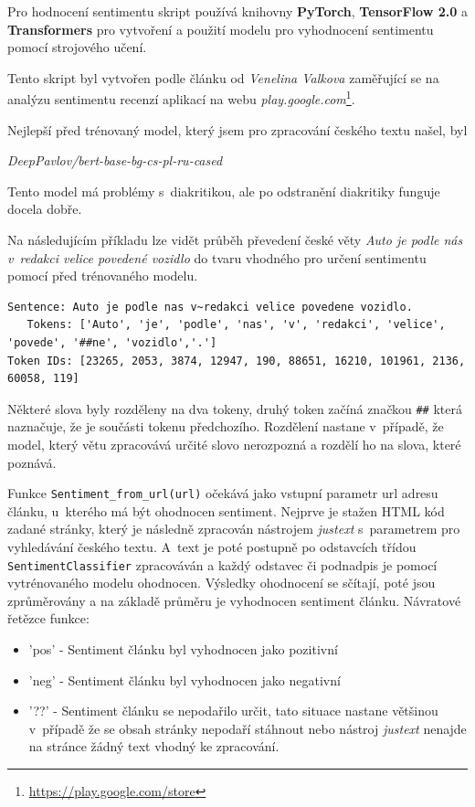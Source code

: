 Pro hodnocení sentimentu skript používá knihovny \textbf{PyTorch}, \textbf{TensorFlow 2.0} a \textbf{Transformers} pro vytvoření a použití modelu pro vyhodnocení sentimentu pomocí strojového učení.

Tento skript byl vytvořen podle článku od \textit{Venelina Valkova} zaměřující se na analýzu sentimentu recenzí aplikací na webu \textit{play.google.com}\footnote{\url{https://play.google.com/store}}\cite{valkov_2020}.

Nejlepší před trénovaný model, který jsem pro zpracování českého textu našel, byl
\begin{center}
 \textit{DeepPavlov/bert-base-bg-cs-pl-ru-cased}   
\end{center}
Tento model má problémy s~diakritikou, ale po odstranění diakritiky funguje docela dobře.

Na následujícím příkladu lze vidět průběh převedení české věty \textit{Auto je podle nás v~redakci velice povedené vozidlo} do tvaru vhodného pro určení sentimentu pomocí před trénovaného modelu.
\begin{lstlisting}[basicstyle=\small]
 Sentence: Auto je podle nas v~redakci velice povedene vozidlo.
   Tokens: ['Auto', 'je', 'podle', 'nas', 'v', 'redakci', 'velice', 'povede', '##ne', 'vozidlo','.']
Token IDs: [23265, 2053, 3874, 12947, 190, 88651, 16210, 101961, 2136, 60058, 119]
\end{lstlisting}

Některé slova byly rozděleny na dva tokeny, druhý token začíná značkou \verb|##| která naznačuje, že je součásti tokenu předchozího. Rozdělení nastane v~případě, že model, který větu zpracovává určité slovo nerozpozná a rozdělí ho na slova, které poznává.

Funkce \verb|Sentiment_from_url(url)| očekává jako vstupní parametr url adresu článku, u~kterého má být ohodnocen sentiment. Nejprve je stažen HTML kód zadané stránky, který je následně zpracován nástrojem \textit{justext} s~parametrem pro vyhledávání českého textu. A~text je poté postupně po odstavcích třídou \verb|SentimentClassifier| zpracováván a každý odstavec či podnadpis je pomocí vytrénovaného modelu ohodnocen. Výsledky ohodnocení se sčítají, poté jsou zprůměrovány a na základě průměru je vyhodnocen sentiment článku. Návratové řetězce funkce:
\begin{itemize}
    \item 'pos' - Sentiment článku byl vyhodnocen jako pozitivní 
    \item 'neg' - Sentiment článku byl vyhodnocen jako negativní
    \item '??'  - Sentiment článku se nepodařilo určit, tato situace nastane většinou v~případě že se obsah stránky nepodaří stáhnout nebo nástroj \textit{justext} nenajde na stránce žádný text vhodný ke zpracování.
\end{itemize}

